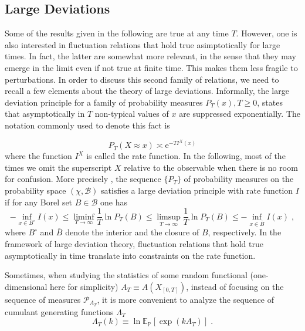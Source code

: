 \documentclass[a4paper,11pt]{article}
\numberwithin{equation}{section}
\begin{document}
\subsection{Large Deviations}
\label{subsec:LD}

Some of the results given in the following are true at any time $T$. However, one is also interested in fluctuation relations that hold true asimptotically for large times. In fact, the latter are somewhat more relevant, in the sense that they may emerge in the limit even if not true at finite time. This makes them less fragile to perturbations.  In order to discuss this second family of relations, we need to recall a few elements about the theory of large deviations.
Informally, the large deviation principle for a family of probability measures $P_T(x), T\geq 0$, states that asymptotically in $T$ non-typical values of $x$ are suppressed exponentially. The notation commonly used to denote this fact is 


\begin{equation*}
    P_T(X \approx x) \asymp \mathrm{e}^{-T I^{X}(x)}
\end{equation*}
where the function $I^{X}$ is called the rate function. In the following, most of the times we omit the superscript $X$ relative to the observable when there is no room for confusion. More precisely \cite{DZ98}, the sequence $\{ P_T \}$ of probability measures on the probability space $(\chi, \mathcal{B})$ satisfies a large deviation principle with rate function $I$ if for any Borel set $B \in \mathcal{B}$ one has
\begin{equation*}
    - \underset{x \in B^\circ}{\inf} I(x) \leq \underset{T \to \infty} {\liminf} \frac{1}{T} \ln P_T(B) \leq \underset{T \to \infty} {\limsup} \frac{1}{T} \ln P_T(B) \leq - \underset{x \in \overline{B}}{\inf} I(x) \;,
\end{equation*}
where $B^\circ$ and $\overline{B}$ denote the interior and the closure of $B$, respectively. In the framework of large deviation theory, fluctuation relations that hold true asymptotically in time translate into constraints on the rate function.

Sometimes, when studying the statistics of some random functional (one-dimensional here for simplicity) $A_T \equiv A(X_{[0,T]})$, instead of focusing on the sequence of measures $\mathcal{P}_{A_T}$, it is more convenient to analyze the sequence of cumulant generating functions $\Lambda_T$ 
\begin{equation*}
\Lambda_T(k)  \equiv \ln \mathbb{E}_{\mathbb{P}} \left[ \exp\left(k A_T\right) \right] \;.
\end{equation*}
\end{document}
